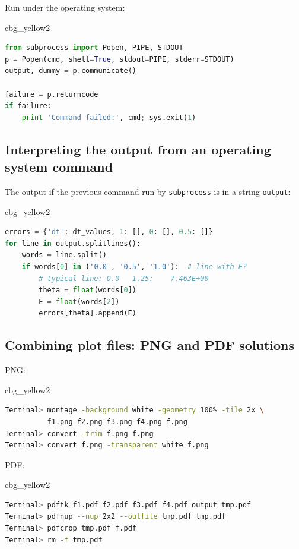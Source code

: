\documentclass[%
oneside,                 %
final,                   %
10pt]{article}
\newenvironment{_cod_tight}[1]{
   \def\FrameCommand{\colorbox{#1}}
   \FrameRule0.6pt\MakeFramed {\FrameRestore}\vskip3mm}
   {\vskip0mm\endMakeFramed}
\newenvironment{cod}[1]{
\bgroup\rmfamily
\fboxsep=0mm\relax
\begin{_cod_tight}{#1}
\list{}{\parsep=-2mm\parskip=0mm\topsep=0pt\leftmargin=2mm
\rightmargin=2\leftmargin\leftmargin=4pt\relax}
\item\relax}
{\endlist\end{_cod_tight}\egroup}
\begin{document}
Run under the operating system:

\begin{cod}{cbg_yellow2}\begin{lstlisting}[language=Python,style=simple,xleftmargin=2mm]
from subprocess import Popen, PIPE, STDOUT
p = Popen(cmd, shell=True, stdout=PIPE, stderr=STDOUT)
output, dummy = p.communicate()

failure = p.returncode
if failure:
    print 'Command failed:', cmd; sys.exit(1)
\end{lstlisting}\end{cod}
\noindent

\subsection*{Interpreting the output from an operating system command}

The output if the previous command run by \texttt{subprocess} is in a string
\texttt{output}:

\begin{cod}{cbg_yellow2}\begin{lstlisting}[language=Python,style=simple,xleftmargin=2mm]
errors = {'dt': dt_values, 1: [], 0: [], 0.5: []}
for line in output.splitlines():
    words = line.split()
    if words[0] in ('0.0', '0.5', '1.0'):  # line with E?
        # typical line: 0.0   1.25:    7.463E+00
        theta = float(words[0])
        E = float(words[2])
        errors[theta].append(E)
\end{lstlisting}\end{cod}
\noindent

\subsection*{Combining plot files: PNG and PDF solutions}

PNG:

\begin{cod}{cbg_yellow2}\begin{lstlisting}[language=bash,style=simple,xleftmargin=2mm]
Terminal> montage -background white -geometry 100% -tile 2x \ 
          f1.png f2.png f3.png f4.png f.png
Terminal> convert -trim f.png f.png
Terminal> convert f.png -transparent white f.png
\end{lstlisting}\end{cod}
\noindent

PDF:

\begin{cod}{cbg_yellow2}\begin{lstlisting}[language=bash,style=simple,xleftmargin=2mm]
Terminal> pdftk f1.pdf f2.pdf f3.pdf f4.pdf output tmp.pdf
Terminal> pdfnup --nup 2x2 --outfile tmp.pdf tmp.pdf
Terminal> pdfcrop tmp.pdf f.pdf
Terminal> rm -f tmp.pdf
\end{lstlisting}\end{cod}
\noindent
\end{document}
